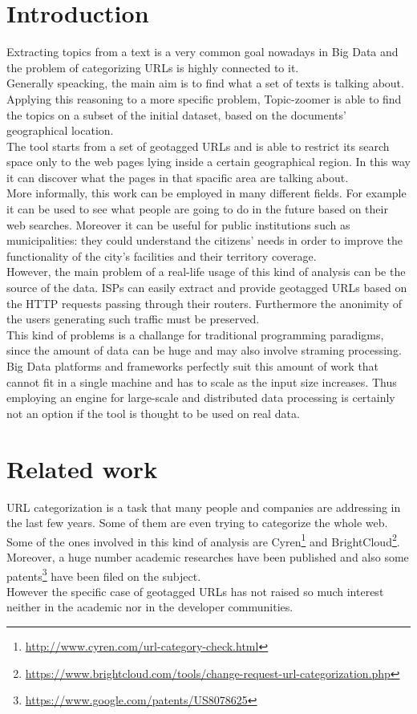 \documentclass{sig-alternate-05-2015}
\begin{document}
\section{Introduction}
Extracting topics from a text is a very common goal nowadays in Big Data and the problem of categorizing URLs is highly connected to it.\\
Generally speacking, the main aim is to find what a set of texts is talking about. Applying this reasoning to a more specific problem, Topic-zoomer is able to find the topics on a subset of the initial dataset, based on the documents' geographical location.\\
The tool starts from a set of geotagged URLs and is able to restrict its search space only to the web pages lying inside a certain geographical region. In this way it can discover what the pages in that spacific area are talking about.\\
More informally, this work can be employed in many different fields. For example it can be used to see what people are going to do in the future based on their web searches. Moreover it can be useful for public institutions such as municipalities: they could understand the citizens' needs in order to improve the functionality of the city's facilities and their territory coverage.\\
However, the main problem of a real-life usage of this kind of analysis can be the source of the data. ISPs can easily extract and provide geotagged URLs based on the HTTP requests passing through their routers. Furthermore the anonimity of the users generating such traffic must be preserved.\\
This kind of problems is a challange for traditional programming paradigms, since the amount of data can be huge and may also involve straming  processing. Big Data platforms and frameworks perfectly suit this amount of work that cannot fit in a single machine and has to scale as the input size increases. Thus employing an engine for large-scale and distributed data processing is certainly not an option if the tool is thought to be used on real data.        


\section{Related work}
URL categorization is a task that many people and companies are addressing in the last few years. Some of them are even trying to categorize the whole web. Some of the ones involved in this kind of analysis are Cyren\footnote{\url{http://www.cyren.com/url-category-check.html}} and BrightCloud\footnote{\url{https://www.brightcloud.com/tools/change-request-url-categorization.php}}.\\
Moreover, a huge number academic researches have been published and also some patents\footnote{\url{https://www.google.com/patents/US8078625}} have been filed on the subject.\\
However the specific case of geotagged URLs has not raised so much interest neither in the academic nor in the developer communities.
\end{document}
